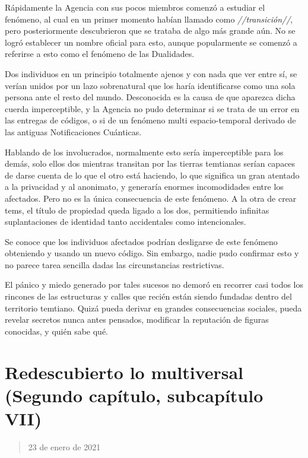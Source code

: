 \documentclass[
  spanish,
]{book}
\begin{document}
Rápidamente la Agencia con sus pocos miembros comenzó a estudiar el fenómeno, al cual en un primer momento habían llamado como \emph{//transición//}, pero posteriormente descubrieron que se trataba de algo más grande aún. No se logró establecer un nombre oficial para esto, aunque popularmente se comenzó a referirse a esto como el fenómeno de las Dualidades.

Dos individuos en un principio totalmente ajenos y con nada que ver entre sí, se verían unidos por un lazo sobrenatural que los haría identificarse como una sola persona ante el resto del mundo. Desconocida es la causa de que aparezca dicha cuerda imperceptible, y la Agencia no pudo determinar si se trata de un error en las entregas de códigos, o si de un fenómeno multi espacio-temporal derivado de las antiguas Notificaciones Cuánticas.

Hablando de los involucrados, normalmente esto sería imperceptible para los demás, solo ellos dos mientras transitan por las tierras temtianas serían capaces de darse cuenta de lo que el otro está haciendo, lo que significa un gran atentado a la privacidad y al anonimato, y generaría enormes incomodidades entre los afectados. Pero no es la única consecuencia de este fenómeno. A la otra de crear tems, el título de propiedad queda ligado a los dos, permitiendo infinitas suplantaciones de identidad tanto accidentales como intencionales.

Se conoce que los individuos afectados podrían desligarse de este fenómeno obteniendo y usando un nuevo código. Sin embargo, nadie pudo confirmar esto y no parece tarea sencilla dadas las circunstancias restrictivas.

El pánico y miedo generado por tales sucesos no demoró en recorrer casi todos los rincones de las estructuras y calles que recién están siendo fundadas dentro del territorio temtiano. Quizá pueda derivar en grandes consecuencias sociales, pueda revelar secretos nunca antes pensados, modificar la reputación de figuras conocidas, y quién sabe qué.

\hypertarget{redescubierto-lo-multiversal-segundo-capuxedtulo-subcapuxedtulo-vii}{%
\section{Redescubierto lo multiversal (Segundo capítulo, subcapítulo VII)}\label{redescubierto-lo-multiversal-segundo-capuxedtulo-subcapuxedtulo-vii}}

\begin{quote}
23 de enero de 2021
\end{quote}
\end{document}
